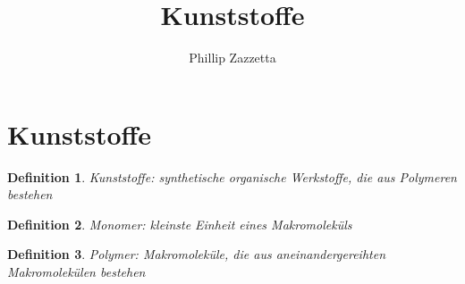 \documentclass{article}
\title{Kunststoffe}
\author{Phillip Zazzetta}
\begin{document}
\newtheorem*{definition}{Definition}
\maketitle

\section*{Kunststoffe}
\begin{definition}
    Kunststoffe: synthetische organische Werkstoffe, die aus Polymeren bestehen
\end{definition}
\begin{definition}
    Monomer: kleinste Einheit eines Makromoleküls
\end{definition} 
\begin{definition}
    Polymer: Makromoleküle, die aus aneinandergereihten Makromolekülen bestehen
\end{definition}
\end{document}
